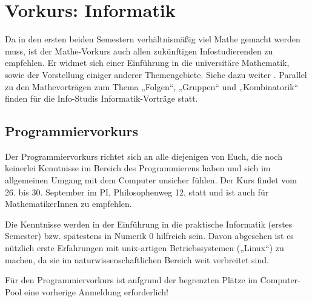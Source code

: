 \section{Vorkurs: Informatik}
\label{vkinfo}
Da in den ersten beiden Semestern verhältnismäßig viel Mathe gemacht werden muss, ist der Mathe-Vorkurs auch allen zukünftigen Infostudierenden zu empfehlen. Er widmet sich einer Einführung in die universitäre Mathematik, sowie der Vorstellung einiger anderer Themengebiete. Siehe dazu weiter
.
Parallel zu den Mathevorträgen zum Thema „Folgen“, „Gruppen“ und „Kombinatorik“ finden für die Info-Studis Informatik-Vorträge statt.

\parskip

\subsection{Programmiervorkurs}
Der Programmiervorkurs richtet sich an alle diejenigen von Euch, die noch
keinerlei Kenntnisse im Bereich des Programmierens haben und sich im
allgemeinen Umgang mit dem Computer unsicher fühlen. Der Kurs findet vom 26.
bis 30. September im \gls{PI}, Philosophenweg 12, statt und ist auch für
MathematikerInnen zu empfehlen.

Die Kenntnisse werden in der Einführung in die praktische Informatik (erstes
Semester) bzw. spätestens in Numerik 0 hilfreich sein. Davon abgesehen ist es
nützlich erste Erfahrungen mit unix-artigen Betriebssystemen („Linux“) zu
machen, da sie im naturwissenschaftlichen Bereich weit verbreitet sind.

Für den Programmiervorkurs ist aufgrund der begrenzten Plätze im Computer-Pool
eine vorherige Anmeldung erforderlich!
